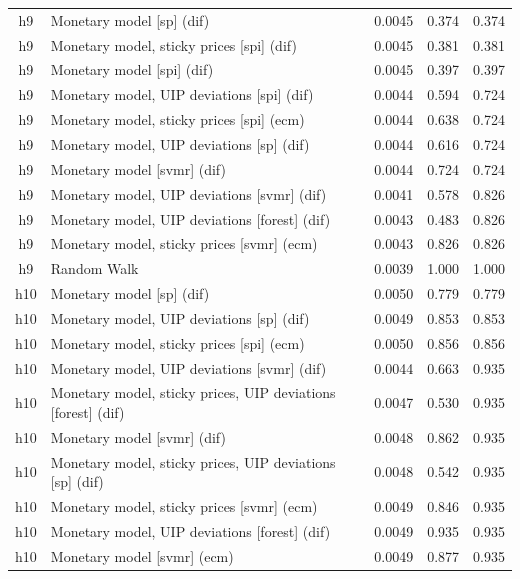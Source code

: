 \begin{ThreePartTable}
\begin{longtable}[t]{cp{5.5cm}ccc}
\addlinespace
h9 & \raggedright Monetary model [sp] (dif) & 0.0045 & 0.374 & 0.374\\
h9 & \raggedright Monetary model, sticky prices [spi] (dif) & 0.0045 & 0.381 & 0.381\\
h9 & \raggedright Monetary model [spi] (dif) & 0.0045 & 0.397 & 0.397\\
h9 & \raggedright Monetary model, UIP deviations [spi] (dif) & 0.0044 & 0.594 & 0.724\\
h9 & \raggedright Monetary model, sticky prices [spi] (ecm) & 0.0044 & 0.638 & 0.724\\
h9 & \raggedright Monetary model, UIP deviations [sp] (dif) & 0.0044 & 0.616 & 0.724\\
h9 & \raggedright Monetary model [svmr] (dif) & 0.0044 & 0.724 & 0.724\\
h9 & \raggedright Monetary model, UIP deviations [svmr] (dif) & 0.0041 & 0.578 & 0.826\\
h9 & \raggedright Monetary model, UIP deviations [forest] (dif) & 0.0043 & 0.483 & 0.826\\
h9 & \raggedright Monetary model, sticky prices [svmr] (ecm) & 0.0043 & 0.826 & 0.826\\
h9 & \raggedright Random Walk & 0.0039 & 1.000 & 1.000\\
\addlinespace
h10 & \raggedright Monetary model [sp] (dif) & 0.0050 & 0.779 & 0.779\\
h10 & \raggedright Monetary model, UIP deviations [sp] (dif) & 0.0049 & 0.853 & 0.853\\
h10 & \raggedright Monetary model, sticky prices [spi] (ecm) & 0.0050 & 0.856 & 0.856\\
h10 & \raggedright Monetary model, UIP deviations [svmr] (dif) & 0.0044 & 0.663 & 0.935\\
h10 & \raggedright Monetary model, sticky prices, UIP deviations [forest] (dif) & 0.0047 & 0.530 & 0.935\\
h10 & \raggedright Monetary model [svmr] (dif) & 0.0048 & 0.862 & 0.935\\
h10 & \raggedright Monetary model, sticky prices, UIP deviations [sp] (dif) & 0.0048 & 0.542 & 0.935\\
h10 & \raggedright Monetary model, sticky prices [svmr] (ecm) & 0.0049 & 0.846 & 0.935\\
h10 & \raggedright Monetary model, UIP deviations [forest] (dif) & 0.0049 & 0.935 & 0.935\\
h10 & \raggedright Monetary model [svmr] (ecm) & 0.0049 & 0.877 & 0.935\\

\end{longtable}
\end{ThreePartTable}
